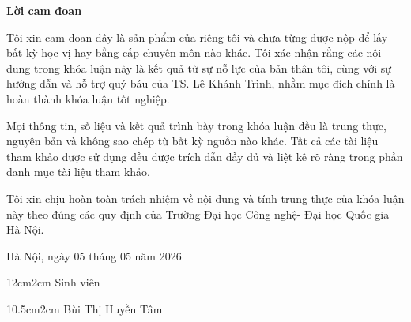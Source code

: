 \setlength{\parindent}{2em}

\setcounter{page}{1}
\begin{center}
\textbf{\large{Lời cam đoan}	}
\end{center}

Tôi xin cam đoan đây là sản phẩm của riêng tôi và chưa từng được nộp để
lấy bất kỳ học vị hay bằng cấp chuyên môn nào khác. Tôi xác nhận rằng các nội dung trong khóa luận này là kết quả từ sự nỗ lực của bản thân tôi, cùng với sự hướng dẫn và hỗ trợ quý báu của TS. Lê Khánh Trình, nhằm mục đích chính là hoàn thành khóa luận tốt nghiệp.

Mọi thông tin, số liệu và kết quả trình bày trong khóa luận đều là trung thực, nguyên bản và không sao chép từ bất kỳ nguồn nào khác. Tất cả các tài liệu tham khảo được sử dụng đều được trích dẫn đầy đủ và liệt kê rõ ràng trong phần danh mục tài liệu tham khảo.

Tôi xin chịu hoàn toàn trách nhiệm về nội dung và tính trung thực của khóa luận này theo đúng các quy định của Trường Đại học Công nghệ- Đại học Quốc gia Hà Nội.

\begin{flushright}
Hà Nội, ngày  05  tháng  05   năm   2026
\end{flushright}

\begin{changemargin}{12cm}{2cm}
Sinh viên
\\[2cm]
\end{changemargin}

\begin{changemargin}{10.5cm}{2cm}
Bùi Thị Huyền Tâm
\end{changemargin}